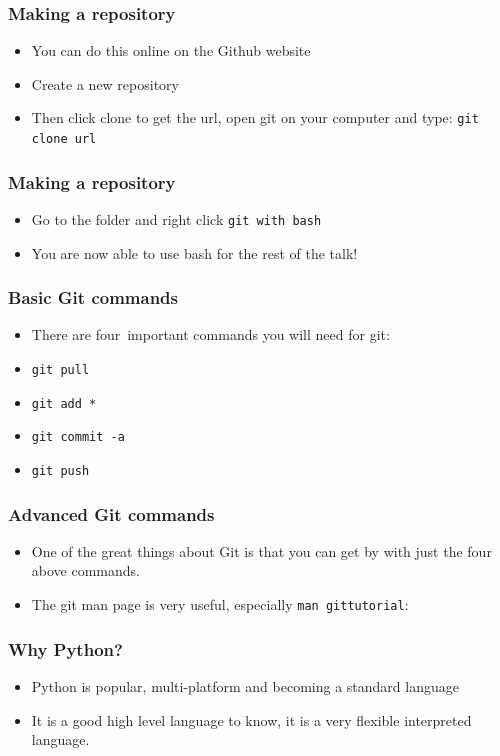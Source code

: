 \documentclass{beamer}
\begin{document}
\begin{frame}
\frametitle{Making a repository}
\begin{itemize}
\item You can do this online on the Github website \footnotemark  
\item Create a new repository
\item Then click clone to get the url, open git on your computer and type: 
	\texttt{git clone url}
\end{itemize}
\end{frame}

\begin{frame}
\frametitle{Making a repository}
\begin{itemize}
	\item Go to the folder and right click \texttt{git with bash}
\item You are now able to use bash for the rest of the talk!
\end{itemize}
\end{frame}

\begin{frame}
\frametitle{Basic Git commands}
\begin{itemize}
	\item There are four\footnotemark\ important commands you will need for git:
	\item \texttt{git pull}
	\item \texttt{git add *}
	\item \texttt{git commit -a}
	\item \texttt{git push}
\end{itemize}
\end{frame}

\begin{frame}
\frametitle{Advanced Git commands}
\begin{itemize}
	\item One of the great things about Git is that you can get by with just the four above commands.
	\item The git man page is very useful, especially \texttt{man gittutorial}:
\end{itemize}
\end{frame}


\begin{frame}
\frametitle{Why Python?} 
\begin{itemize}
	\item Python is popular, multi-platform and becoming a standard language\footnotemark\ 
	\item It is a good high level language to know, it is a very flexible interpreted language.
\end{itemize}
\end{frame}
\end{document}
